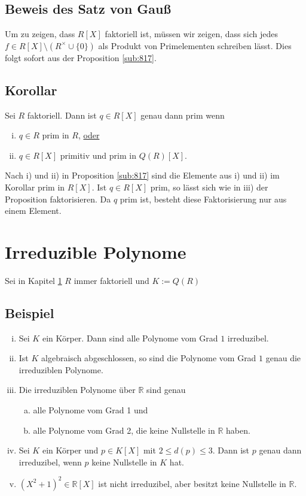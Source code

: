 \subsection{Beweis des Satz von Gauß} %
\label{sub:818}
Um zu zeigen, dass $R[X]$ faktoriell ist, müssen wir zeigen, dass sich jedes $f \in R[X] \setminus ( R^\times \cup \{0\})$ als Produkt von Primelementen schreiben lässt. Dies folgt sofort aus der Proposition \ref{sub:817}. \bewende

\subsection[{Korollar: Äquivalenz zu \glqq prim in $R[X]$\grqq}]{Korollar} %
\label{sub:819}
Sei $R$ faktoriell. Dann ist $q \in R[X]$ genau dann prim wenn 
\begin{enumerate}[i)]
	\item $q \in R$ prim in $R$, \uline{oder}
	\item $q \in R[X]$ primitiv und prim in $Q(R)[X]$.
\end{enumerate}
Nach i) und ii) in Proposition \ref{sub:817} sind die Elemente aus i) und ii) im Korollar prim in $R[X]$. Ist $q \in R[X]$ prim, so lässt sich wie in iii) der Proposition
faktorisieren. Da $q$ prim ist, besteht diese Faktorisierung nur aus einem Element. \bewende
\newpage


\section{Irreduzible Polynome} %
\label{sec:9}
Sei in Kapitel \ref{sec:9} $R$ immer faktoriell und $K:= Q(R)$
\subsection[Beispiele für irreduzible Polynome]{Beispiel} %
\label{sub:91}
\begin{enumerate}[i)]
	\item Sei $K$ ein Körper. Dann sind alle Polynome vom Grad $1$ irreduzibel.
	\item Ist $K$ algebraisch abgeschlossen, so sind die Polynome vom Grad $1$ genau die irreduziblen Polynome.
	\item Die irreduziblen Polynome über $\mathds{R}$ sind genau
	\begin{enumerate}[a)]
		\item alle Polynome vom Grad 1 und
		\item alle Polynome vom Grad 2, die keine Nullstelle in $\mathds{R}$ haben.
	\end{enumerate}
	\item Sei $K$ ein Körper und $p \in K[X]$ mit $2 \le d(p) \le 3$. Dann ist $p$ genau dann irreduzibel, wenn $p$ keine Nullstelle in $K$ hat.
	\item $(X^2+1)^2 \in \mathds{R}[X]$ ist nicht irreduzibel, aber besitzt keine Nullstelle in $\mathds{R}$.
\end{enumerate}

